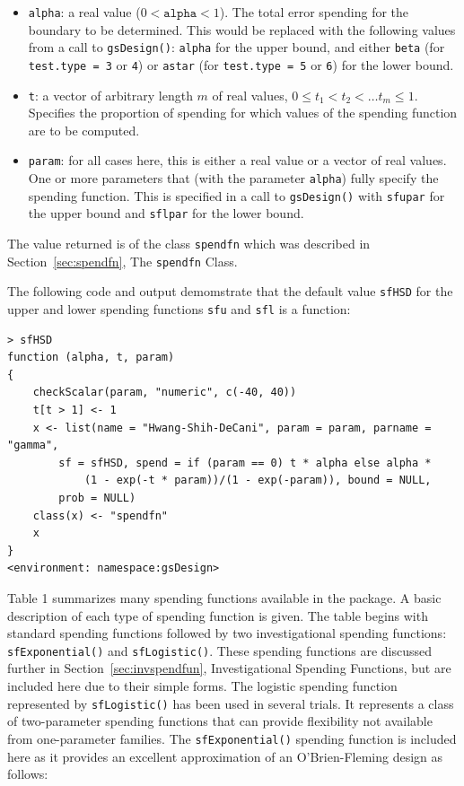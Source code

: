 \begin{itemize}
\item \texttt{alpha}: a real value ($0 < \mathtt{alpha} < 1$).
The total error spending for the boundary to be determined. 
This would be replaced with the following values from a call to \texttt{gsDesign()}:
\texttt{alpha} for the upper bound, and either \texttt{beta} (for
\texttt{test.type = 3} or \texttt{4}) or \texttt{astar} (for 
\texttt{test.type = 5} or \texttt{6}) for the lower bound.

\item \texttt{t}: a vector of arbitrary length $m$ of real values, $0 \leq
t_{1} < t_{2} < \ldots t_{m}\leq1$. 
Specifies the proportion of spending for which values of the spending function are to be computed.

\item \texttt{param}: for all cases here, this is either a real value or a
vector of real values. One or more parameters that (with the parameter
\texttt{alpha}) fully specify the spending function. This is specified in
a call to \texttt{gsDesign()} with \texttt{sfupar} for the upper bound and
\texttt{sflpar} for the lower bound.
\end{itemize}

The value returned is of the class \texttt{spendfn} which was described in 
Section~\ref{sec:spendfn}, The \texttt{spendfn} Class.

The following code and output demomstrate that the default value \texttt{sfHSD} for the upper and lower spending functions \texttt{sfu} and \texttt{sfl} is a function:

\bigskip
\begin{verbatim}
> sfHSD
function (alpha, t, param) 
{
    checkScalar(param, "numeric", c(-40, 40))
    t[t > 1] <- 1
    x <- list(name = "Hwang-Shih-DeCani", param = param, parname = "gamma", 
        sf = sfHSD, spend = if (param == 0) t * alpha else alpha * 
            (1 - exp(-t * param))/(1 - exp(-param)), bound = NULL, 
        prob = NULL)
    class(x) <- "spendfn"
    x
}
<environment: namespace:gsDesign>
\end{verbatim}
\bigskip

Table 1 summarizes many spending functions available in the package. A basic
description of each type of spending function is given. The table begins with
standard spending functions followed by two investigational spending
functions: \texttt{sfExponential()} and \texttt{sfLogistic()}. These spending
functions are discussed further in Section~\ref{sec:invspendfun}, Investigational Spending Functions, but
are included here due to their simple forms. The logistic spending function
represented by \texttt{sfLogistic()} has been used in several trials. It
represents a class of two-parameter spending functions that can provide
flexibility not available from one-parameter families. The
\texttt{sfExponential()} spending function is included here as it provides an
excellent approximation of an O'Brien-Fleming design as follows:

